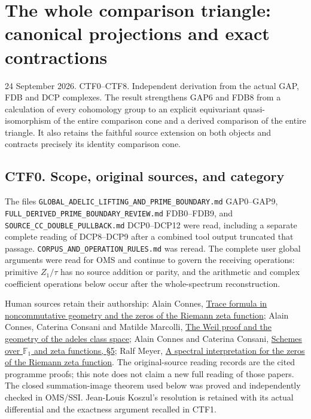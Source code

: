 \section{The whole comparison triangle: canonical projections and exact
contractions}\label{the-whole-comparison-triangle-canonical-projections-and-exact-contractions}

24 September 2026. CTF0--CTF8. Independent derivation from the actual
GAP, FDB and DCP complexes. The result strengthens GAP6 and FDB8 from a
calculation of every cohomology group to an explicit equivariant
quasi-isomorphism of the entire comparison cone and a derived comparison
of the entire triangle. It also retains the faithful source extension on
both objects and contracts precisely its identity comparison cone.

\subsection{CTF0. Scope, original sources, and
category}\label{ctf0.-scope-original-sources-and-category}

The files \nolinkurl{GLOBAL_ADELIC_LIFTING_AND_PRIME_BOUNDARY.md} GAP0--GAP9,
\nolinkurl{FULL_DERIVED_PRIME_BOUNDARY_REVIEW.md} FDB0--FDB9, and
\nolinkurl{SOURCE_CC_DOUBLE_PULLBACK.md} DCP0--DCP12 were read, including a
separate complete reading of DCP8--DCP9 after a combined tool output
truncated that passage. \nolinkurl{CORPUS_AND_OPERATION_RULES.md} was reread. The
complete user global arguments were read for OMS and continue to govern
the receiving operations: primitive \(Z_1/\tau\) has no source addition
or parity, and the arithmetic and complex coefficient operations below
occur after the whole-spectrum reconstruction.

Human sources retain their authorship: Alain Connes,
\href{https://arxiv.org/abs/math/9811068v1}{Trace formula in
noncommutative geometry and the zeros of the Riemann zeta function};
Alain Connes, Caterina Consani and Matilde Marcolli,
\href{https://arxiv.org/abs/math/0703392v1}{The Weil proof and the
geometry of the adeles class space}; Alain Connes and Caterina Consani,
\href{https://arxiv.org/abs/0903.2024v3}{Schemes over \(\mathbb F_1\)
and zeta functions, §5}; Ralf Meyer,
\href{https://arxiv.org/abs/math/0412277v3}{A spectral interpretation
for the zeros of the Riemann zeta function}. The original-source reading
records are the cited programme proofs; this note does not claim a new
full reading of those papers. The closed summation-image theorem used
below was proved and independently checked in OMS/SSI. Jean-Louis
Koszul's resolution is retained with its actual differential and the
exactness argument recalled in CTF1.

